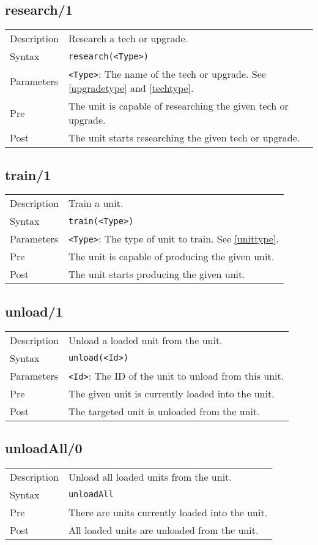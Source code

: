 \subsection{research/1}
\begin{tabularx}{\textwidth}{lX}
 Description & Research a tech or upgrade. \\
 Syntax & \verb|research(<Type>)| \\
 Parameters & \verb|<Type>|: The name of the tech or upgrade. See \ref{upgradetype} and \ref{techtype}. \\
 Pre & The unit is capable of researching the given tech or upgrade. \\
 Post & The unit starts researching the given tech or upgrade.
\end{tabularx}

\subsection{train/1}
\begin{tabularx}{\textwidth}{lX}
 Description & Train a unit. \\
 Syntax & \verb|train(<Type>)| \\
 Parameters & \verb|<Type>|: The type of unit to train. See \ref{unittype}. \\
 Pre & The unit is capable of producing the given unit. \\
 Post & The unit starts producing the given unit.
\end{tabularx}

\subsection{unload/1}
\begin{tabularx}{\textwidth}{lX}
 Description & Unload a loaded unit from the unit. \\
 Syntax & \verb|unload(<Id>)| \\
 Parameters & \verb|<Id>|: The ID of the unit to unload from this unit.\\
 Pre & The given unit is currently loaded into the unit. \\
 Post & The targeted unit is unloaded from the unit.
\end{tabularx}

\subsection{unloadAll/0}
\begin{tabularx}{\textwidth}{lX}
 Description & Unload all loaded units from the unit. \\
 Syntax & \verb|unloadAll| \\
 Pre & There are units currently loaded into the unit. \\
 Post & All loaded units are unloaded from the unit.
\end{tabularx}

